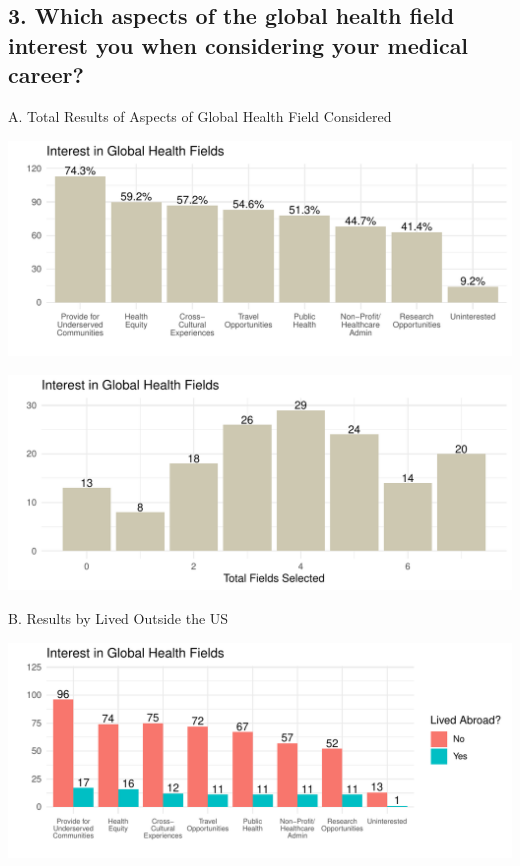 \documentclass[
  letterpaper,
  DIV=11,
  numbers=noendperiod]{scrartcl}
\begin{document}
\newpage

\hypertarget{which-aspects-of-the-global-health-field-interest-you-when-considering-your-medical-career}{%
\subsection{3. Which aspects of the global health field interest you
when considering your medical
career?}\label{which-aspects-of-the-global-health-field-interest-you-when-considering-your-medical-career}}

A. Total Results of Aspects of Global Health Field Considered

\includegraphics{GlobalHealthQuarto1-5_files/figure-pdf/unnamed-chunk-21-1.pdf}

\includegraphics{GlobalHealthQuarto1-5_files/figure-pdf/unnamed-chunk-22-1.pdf}

\newpage

B. Results by Lived Outside the US

\includegraphics{GlobalHealthQuarto1-5_files/figure-pdf/unnamed-chunk-23-1.pdf}
\end{document}
